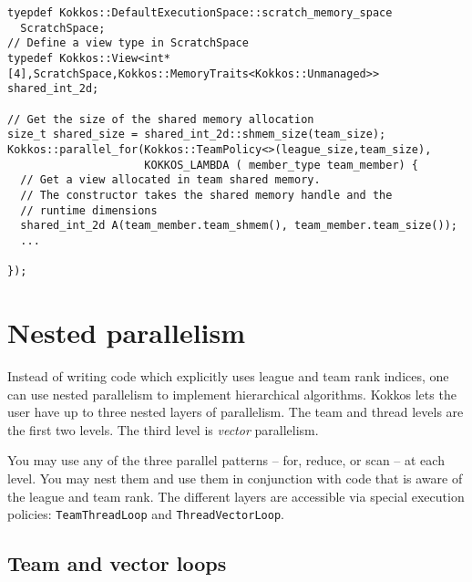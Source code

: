 \begin{lstlisting}
tyepdef Kokkos::DefaultExecutionSpace::scratch_memory_space
  ScratchSpace;
// Define a view type in ScratchSpace
typedef Kokkos::View<int*[4],ScratchSpace,Kokkos::MemoryTraits<Kokkos::Unmanaged>> shared_int_2d;

// Get the size of the shared memory allocation
size_t shared_size = shared_int_2d::shmem_size(team_size);
Kokkos::parallel_for(Kokkos::TeamPolicy<>(league_size,team_size),
                     KOKKOS_LAMBDA ( member_type team_member) {
  // Get a view allocated in team shared memory.
  // The constructor takes the shared memory handle and the 
  // runtime dimensions
  shared_int_2d A(team_member.team_shmem(), team_member.team_size());
  ...
      
});
\end{lstlisting}

\section{Nested parallelism}\label{S:Hierarchical:Nested}

Instead of writing code which explicitly uses league and team rank indices, one can use nested parallelism to implement hierarchical algorithms.
Kokkos lets the user have up to three nested layers of parallelism.
The team and thread levels are the first two levels.
The third level is \emph{vector} parallelism.

You may use any of the three parallel patterns -- for, reduce, or scan -- at each level.
You may nest them and use them in conjunction with code that is aware of the league and team rank.
The different layers are accessible via special execution policies:
\lstinline|TeamThreadLoop| and \lstinline|ThreadVectorLoop|. 

\subsection{Team and vector loops}\label{SS:Hierarchical:Nested:Loops}

